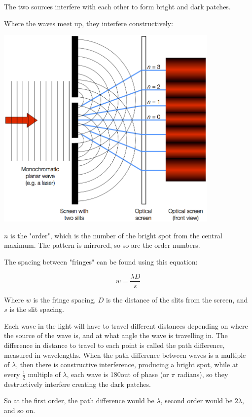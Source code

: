 \documentclass[a4paper, 12pt]{article}
\begin{document}
The two sources interfere with each other to form bright and dark patches.

Where the waves meet up, they interfere constructively:

\begin{center}
\includegraphics[height=10cm]{images/Double-slit-diffraction-diagram.png}
\end{center}

$n$ is the "order", which is the number of the bright spot from the central maximum. The pattern is mirrored, so so are the order numbers.

The spacing between "fringes" can be found using this equation:

$$
w = \frac{{\lambda}D}{s}
$$

Where $w$ is the fringe spacing, $D$ is the distance of the slits from the screen, and $s$ is the slit spacing. 

Each wave in the light will have to travel different distances depending on where the source of the wave is, and at what angle the wave is travelling in. The difference in distance to travel to each point is called the path difference, measured in wavelengths. When the path difference between waves is a multiple of $\lambda$, then there is constructive interference, producing a bright spot, while at every $\frac{1}{2}$ multiple of $\lambda$, each wave is 180\textdegree out of phase (or $\pi$ radians), so they destructively interfere creating the dark patches.

So at the first order, the path difference would be $\lambda$, second order would be $2{\lambda}$, and so on.
\end{document}
